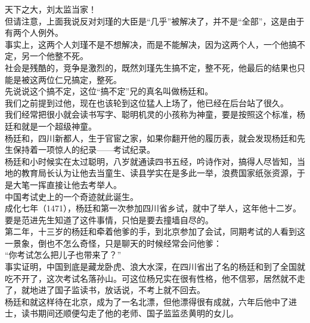 \begin{multicols}{\theparacolNo}
天下之大，刘太监当家！\\

但请注意，上面我说反对刘瑾的大臣是“几乎”被解决了，并不是“全部”，这是由于有两个人例外。\\

事实上，这两个人刘瑾不是不想解决，而是不能解决，因为这两个人，一个他搞不定，另一个他整不死。\\

社会是残酷的，竞争是激烈的，既然刘瑾先生搞不定，整不死，他最后的结果也只能是被这两位仁兄搞定，整死。\\

先说说这个搞不定，这位“搞不定”兄的真名叫做杨廷和。\\

我们之前提到过他，现在也该轮到这位猛人上场了，他已经在后台站了很久。\\

我们经常把很小就会读书写字、聪明机灵的小孩称为神童，要是按照这个标准，杨廷和就是一个超级神童。\\

杨廷和，四川新都人，生于官宦之家，如果你翻开他的履历表，就会发现杨廷和先生保持着一项惊人的纪录——考试纪录。\\

杨廷和小时候实在太过聪明，八岁就通读四书五经，吟诗作对，搞得人尽皆知，当地的教育局长认为让他去当童生、读县学实在是多此一举，浪费国家纸张资源，于是大笔一挥直接让他去考举人。\\

中国考试史上的一个奇迹就此诞生。\\

成化七年（1471），杨廷和第一次参加四川省乡试，就中了举人，这年他十二岁。要是范进先生知道了这件事情，只怕是要去撞墙自尽的。\\

第二年，十三岁的杨廷和牵着他爹的手，到北京参加了会试，同期考试的人看到这一景象，倒也不怎么奇怪，只是聊天的时候经常会问他爹：\\

“你考试怎么把儿子也带来了？”\\

事实证明，中国到底是藏龙卧虎、浪大水深，在四川省出了名的杨廷和到了全国就吃不开了，这次考试名落孙山。可这位杨兄实在很有性格，他不信邪，居然就不走了，就地进了国子监读书，放话说，不考上就不回去。\\

杨廷和就这样待在北京，成为了一名北漂，但他漂得很有成就，六年后他中了进士，读书期间还顺便勾走了他的老师、国子监监丞黄明的女儿。\\


\end{multicols}
